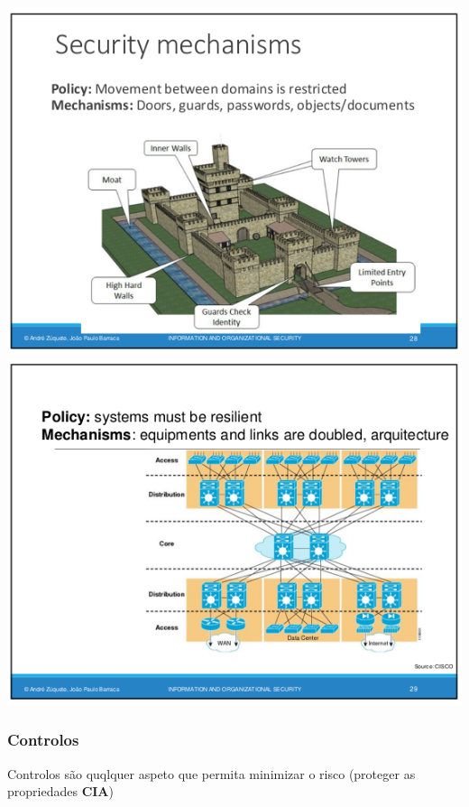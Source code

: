 \documentclass{article}
\begin{document}
\begin{center}
  \includegraphics[scale=0.4]{5}
  \includegraphics[scale=0.4]{6}
\end{center}

\pagebreak

\subsubsection{Controlos}

Controlos são quqlquer aspeto que permita minimizar o risco (proteger as propriedades \textbf{CIA})
\end{document}
